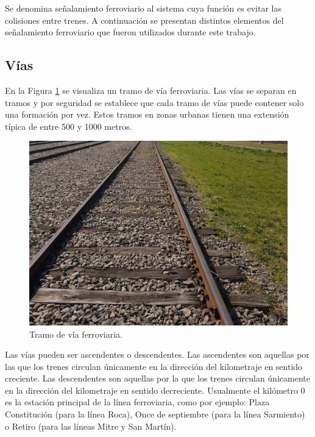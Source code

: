 		Se denomina señalamiento ferroviario al sistema cuya función es evitar las colisiones entre trenes. A continuación se presentan distintos elementos del señalamiento ferroviario que fueron utilizados durante este trabajo.
		
		\subsection{Vías}
			
			En la Figura \ref{fig:Via_eclisa} se visualiza un tramo de vía ferroviaria. Las vías se separan en tramos y por seguridad se establece que cada tramo de vías puede contener solo una formación por vez. Estos tramos en zonas urbanas tienen una extensión típica de entre 500 y 1000 metros.
			
			\begin{figure}[htbp!]
				\centering
				\includegraphics[scale=.12]{./Figures/Tramo_via}
				\caption{Tramo de vía ferroviaria.}
				\label{fig:Via_eclisa}
			\end{figure}					
			
			Las vías pueden ser ascendentes o descendentes. Las ascendentes son aquellas por las que los trenes circulan únicamente en la dirección del kilometraje en sentido creciente. Las descendentes son aquellas por la que los trenes circulan únicamente en la dirección del kilometraje en sentido decreciente\citep{RITO}. Usualmente el kilómetro 0 es la estación principal de la línea ferroviaria, como por ejemplo: Plaza Constitución (para la línea Roca), Once de septiembre (para la línea Sarmiento) o Retiro (para las líneas Mitre y San Martín).
		
